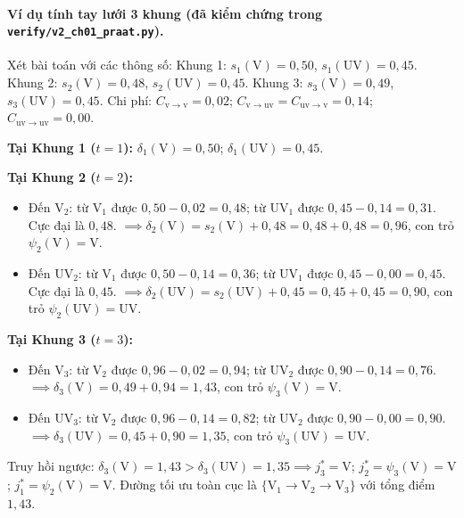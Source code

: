 \paragraph{Ví dụ tính tay lưới 3 khung (đã kiểm chứng trong \texttt{verify/v2\_ch01\_praat.py}).}
Xét bài toán với các thông số:
Khung 1: $s_1(\text{V}) = 0{,}50$, $s_1(\text{UV}) = 0{,}45$.
Khung 2: $s_2(\text{V}) = 0{,}48$, $s_2(\text{UV}) = 0{,}45$.
Khung 3: $s_3(\text{V}) = 0{,}49$, $s_3(\text{UV}) = 0{,}45$.
Chi phí: $C_{\mathrm{v}\to\mathrm{v}} = 0{,}02$; $C_{\mathrm{v}\to\mathrm{uv}} = C_{\mathrm{uv}\to\mathrm{v}} = 0{,}14$; $C_{\mathrm{uv}\to\mathrm{uv}} = 0{,}00$.

\textbf{Tại Khung 1 ($t=1$):} $\delta_1(\text{V}) = 0{,}50$; $\delta_1(\text{UV}) = 0{,}45$.

\textbf{Tại Khung 2 ($t=2$):}
\begin{itemize}[leftmargin=1.2em]
    \item Đến V$_2$: từ V$_1$ được $0{,}50 - 0{,}02 = 0{,}48$; từ UV$_1$ được $0{,}45 - 0{,}14 = 0{,}31$. Cực đại là $0{,}48$.
    $\implies \delta_2(\text{V}) = s_2(\text{V}) + 0{,}48 = 0{,}48 + 0{,}48 = 0{,}96$, con trỏ $\psi_2(\text{V}) = \text{V}$.
    \item Đến UV$_2$: từ V$_1$ được $0{,}50 - 0{,}14 = 0{,}36$; từ UV$_1$ được $0{,}45 - 0{,}00 = 0{,}45$. Cực đại là $0{,}45$.
    $\implies \delta_2(\text{UV}) = s_2(\text{UV}) + 0{,}45 = 0{,}45 + 0{,}45 = 0{,}90$, con trỏ $\psi_2(\text{UV}) = \text{UV}$.
\end{itemize}

\textbf{Tại Khung 3 ($t=3$):}
\begin{itemize}[leftmargin=1.2em]
    \item Đến V$_3$: từ V$_2$ được $0{,}96 - 0{,}02 = 0{,}94$; từ UV$_2$ được $0{,}90 - 0{,}14 = 0{,}76$.
    $\implies \delta_3(\text{V}) = 0{,}49 + 0{,}94 = 1{,}43$, con trỏ $\psi_3(\text{V}) = \text{V}$.
    \item Đến UV$_3$: từ V$_2$ được $0{,}96 - 0{,}14 = 0{,}82$; từ UV$_2$ được $0{,}90 - 0{,}00 = 0{,}90$.
    $\implies \delta_3(\text{UV}) = 0{,}45 + 0{,}90 = 1{,}35$, con trỏ $\psi_3(\text{UV}) = \text{UV}$.
\end{itemize}
Truy hồi ngược: $\delta_3(\text{V}) = 1{,}43 > \delta_3(\text{UV}) = 1{,}35 \implies j^*_3 = \text{V}$; $j^*_2 = \psi_3(\text{V}) = \text{V}$; $j^*_1 = \psi_2(\text{V}) = \text{V}$. Đường tối ưu toàn cục là $\{\text{V}_1 \to \text{V}_2 \to \text{V}_3\}$ với tổng điểm $1{,}43$.

